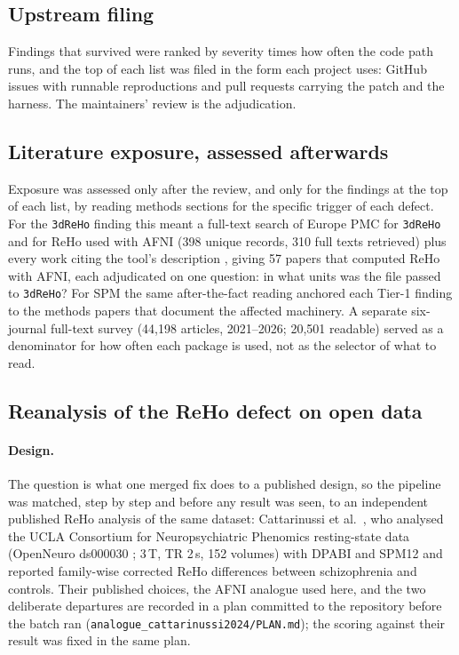 \documentclass[11pt]{article}
\newcommand{\code}[1]{\texttt{#1}}
\begin{document}
\subsection{Upstream filing}
Findings that survived were ranked by severity times how often the code path runs, and the top of each list was filed in the form each project uses: GitHub issues with runnable reproductions and pull requests carrying the patch and the harness. The maintainers' review is the adjudication.

\subsection{Literature exposure, assessed afterwards}
Exposure was assessed only after the review, and only for the findings at the top of each list, by reading methods sections for the specific trigger of each defect. For the \code{3dReHo} finding this meant a full-text search of Europe PMC for \code{3dReHo} and for ReHo used with AFNI (398 unique records, 310 full texts retrieved) plus every work citing the tool's description \cite{taylor2013}, giving 57 papers that computed ReHo with AFNI, each adjudicated on one question: in what units was the file passed to \code{3dReHo}? For SPM the same after-the-fact reading anchored each Tier-1 finding to the methods papers that document the affected machinery. A separate six-journal full-text survey (44{,}198 articles, 2021--2026; 20{,}501 readable) served as a denominator for how often each package is used, not as the selector of what to read.

\subsection{Reanalysis of the ReHo defect on open data}
\paragraph{Design.} The question is what one merged fix does to a published design, so the pipeline was matched, step by step and before any result was seen, to an independent published ReHo analysis of the same dataset: Cattarinussi et al.\ \cite{cattarinussi2024}, who analysed the UCLA Consortium for Neuropsychiatric Phenomics resting-state data (OpenNeuro ds000030 \cite{poldrack2016}; 3\,T, TR 2\,s, 152 volumes) with DPABI \cite{yan2016} and SPM12 and reported family-wise corrected ReHo differences between schizophrenia and controls. Their published choices, the AFNI analogue used here, and the two deliberate departures are recorded in a plan committed to the repository before the batch ran (\code{analogue\_cattarinussi2024/PLAN.md}); the scoring against their result was fixed in the same plan.
\end{document}
